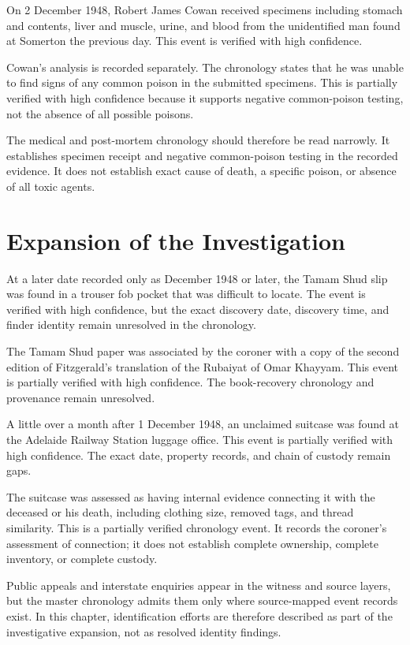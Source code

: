 On 2 December 1948, Robert James Cowan received specimens including stomach and contents, liver and muscle, urine, and blood from the unidentified man found at Somerton the previous day. This event is verified with high confidence.

Cowan's analysis is recorded separately. The chronology states that he was unable to find signs of any common poison in the submitted specimens. This is partially verified with high confidence because it supports negative common-poison testing, not the absence of all possible poisons.

The medical and post-mortem chronology should therefore be read narrowly. It establishes specimen receipt and negative common-poison testing in the recorded evidence. It does not establish exact cause of death, a specific poison, or absence of all toxic agents.

\section{Expansion of the Investigation}

At a later date recorded only as December 1948 or later, the Tamam Shud slip was found in a trouser fob pocket that was difficult to locate. The event is verified with high confidence, but the exact discovery date, discovery time, and finder identity remain unresolved in the chronology.

The Tamam Shud paper was associated by the coroner with a copy of the second edition of Fitzgerald's translation of the Rubaiyat of Omar Khayyam. This event is partially verified with high confidence. The book-recovery chronology and provenance remain unresolved.

A little over a month after 1 December 1948, an unclaimed suitcase was found at the Adelaide Railway Station luggage office. This event is partially verified with high confidence. The exact date, property records, and chain of custody remain gaps.

The suitcase was assessed as having internal evidence connecting it with the deceased or his death, including clothing size, removed tags, and thread similarity. This is a partially verified chronology event. It records the coroner's assessment of connection; it does not establish complete ownership, complete inventory, or complete custody.

Public appeals and interstate enquiries appear in the witness and source layers, but the master chronology admits them only where source-mapped event records exist. In this chapter, identification efforts are therefore described as part of the investigative expansion, not as resolved identity findings.

